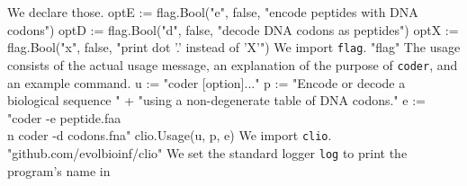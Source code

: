 We declare those.
\nwenddocs{}\endmoddef\nwstartdeflinemarkup{}\nwenddeflinemarkup
optE := flag.Bool("e", false, "encode peptides with DNA codons")
optD := flag.Bool("d", false, "decode DNA codons as peptides")
optX := flag.Bool("x", false, "print dot '.' instead of 'X'")
\nwendcode{}\nwdocspar
We import \texttt{flag}.
\nwenddocs{}\endmoddef\nwstartdeflinemarkup{}\nwenddeflinemarkup
"flag"
\nwendcode{}\nwdocspar
The usage consists of the actual usage message, an explanation of the
purpose of \texttt{coder}, and an example command.
\nwenddocs{}\endmoddef\nwstartdeflinemarkup{}\nwenddeflinemarkup
u := "coder [option]..."
p := "Encode or decode a biological sequence " +
          "using a non-degenerate table of DNA codons."
e := "coder -e peptide.faa\\n         coder -d codons.fna"
clio.Usage(u, p, e)
\nwendcode{}\nwdocspar
We import \texttt{clio}.
\nwenddocs{}\plusendmoddef\nwstartdeflinemarkup{}\nwenddeflinemarkup
"github.com/evolbioinf/clio"
\nwendcode{}\nwdocspar
We set the standard logger \texttt{log} to print the program's name in
